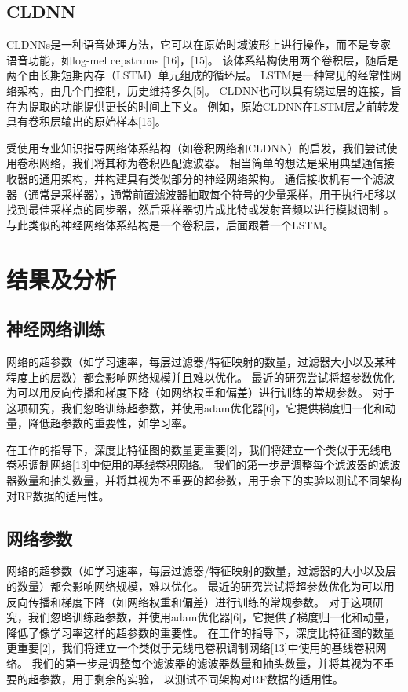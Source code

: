 \subsection{CLDNN}
CLDNNs是一种语音处理方法，它可以在原始时域波形上进行操作，而不是专家语音功能，如log-mel cepstrums [16]，[15]。 该体系结构使用两个卷积层，随后是两个由长期短期内存（LSTM）单元组成的循环层。 LSTM是一种常见的经常性网络架构，由几个门控制，历史维持多久[5]。 CLDNN也可以具有绕过层的连接，旨在为提取的功能提供更长的时间上下文。 例如，原始CLDNN在LSTM层之前转发具有卷积层输出的原始样本[15]。\par

受使用专业知识指导网络体系结构（如卷积网络和CLDNN）的启发，我们尝试使用卷积网络，我们将其称为卷积匹配滤波器。 相当简单的想法是采用典型通信接收器的通用架构，并构建具有类似部分的神经网络架构。 通信接收机有一个滤波器（通常是采样器），通常前置滤波器抽取每个符号的少量采样，用于执行相移以找到最佳采样点的同步器，然后采样器切片成比特或发射音频以进行模拟调制 。与此类似的神经网络体系结构是一个卷积层，后面跟着一个LSTM。\par


\section{结果及分析}

\subsection{神经网络训练}

网络的超参数（如学习速率，每层过滤器/特征映射的数量，过滤器大小以及某种程度上的层数）都会影响网络规模并且难以优化。 最近的研究尝试将超参数优化为可以用反向传播和梯度下降（如网络权重和偏差）进行训练的常规参数。 对于这项研究，我们忽略训练超参数，并使用adam优化器[6]，它提供梯度归一化和动量，降低超参数的重要性，如学习率。

在工作的指导下，深度比特征图的数量更重要[2]，我们将建立一个类似于无线电卷积调制网络[13]中使用的基线卷积网络。 我们的第一步是调整每个滤波器的滤波器数量和抽头数量，并将其视为不重要的超参数，用于余下的实验以测试不同架构对RF数据的适用性。


\subsection{网络参数}

网络的超参数（如学习速率，每层过滤器/特征映射的数量，过滤器的大小以及层的数量）都会影响网络规模，难以优化。
最近的研究尝试将超参数优化为可以用反向传播和梯度下降（如网络权重和偏差）进行训练的常规参数。
对于这项研究，我们忽略训练超参数，并使用adam优化器[6]，它提供了梯度归一化和动量，降低了像学习率这样的超参数的重要性。
在工作的指导下，深度比特征图的数量更重要[2]，我们将建立一个类似于无线电卷积调制网络[13]中使用的基线卷积网络。
我们的第一步是调整每个滤波器的滤波器数量和抽头数量，并将其视为不重要的超参数，用于剩余的实验，
以测试不同架构对RF数据的适用性。\par

